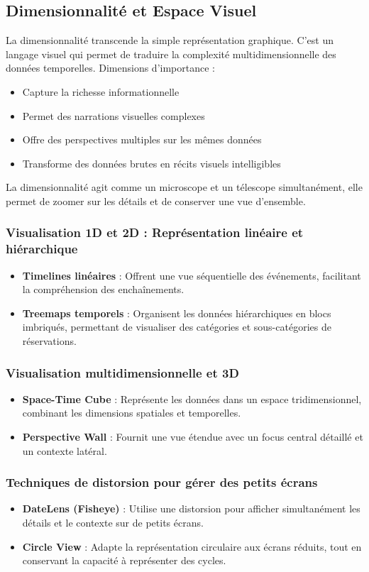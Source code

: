 \documentclass[runningheads]{llncs}
\begin{document}
\subsection{Dimensionnalité et Espace Visuel}
La dimensionnalité transcende la simple représentation graphique. C'est un langage visuel qui permet de traduire la complexité multidimensionnelle des données temporelles.
Dimensions d'importance :
\begin{itemize}
    \item Capture la richesse informationnelle
    \item Permet des narrations visuelles complexes
    \item Offre des perspectives multiples sur les mêmes données
    \item Transforme des données brutes en récits visuels intelligibles
\end{itemize}
La dimensionnalité agit comme un microscope et un télescope simultanément, elle permet de zoomer sur les détails et de conserver une vue d'ensemble.
\subsubsection{Visualisation 1D et 2D : Représentation linéaire et hiérarchique}
\begin{itemize}
    \item \textbf{Timelines linéaires} : Offrent une vue séquentielle des événements, facilitant la compréhension des enchaînements.
    \item \textbf{Treemaps temporels} : Organisent les données hiérarchiques en blocs imbriqués, permettant de visualiser des catégories et sous-catégories de réservations.
\end{itemize}

\subsubsection{Visualisation multidimensionnelle et 3D}
\begin{itemize}
    \item \textbf{Space-Time Cube} : Représente les données dans un espace tridimensionnel, combinant les dimensions spatiales et temporelles.
    \item \textbf{Perspective Wall} : Fournit une vue étendue avec un focus central détaillé et un contexte latéral.
\end{itemize}

\subsubsection{Techniques de distorsion pour gérer des petits écrans}
\begin{itemize}
    \item \textbf{DateLens (Fisheye)} : Utilise une distorsion pour afficher simultanément les détails et le contexte sur de petits écrans.
    \item \textbf{Circle View} : Adapte la représentation circulaire aux écrans réduits, tout en conservant la capacité à représenter des cycles.
\end{itemize}
\end{document}

